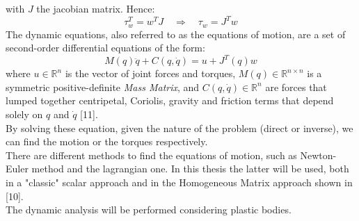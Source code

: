 \documentclass[a4paper,12pt,oneside]{report}
\begin{document}
with $J$ the jacobian matrix. Hence:
\begin{equation}
  \tau_w^T=w^TJ \quad \Rightarrow \quad \tau_w=J^Tw
  \label{force_jacobian}
\end{equation}
The dynamic equations, also referred to as the equations of motion, are a set of second-order differential equations of the form:
\begin{equation}
  M(q)\ddot{q}+C(q,\dot{q})=u+J^T(q)w
  \label{equation_motion}
\end{equation}
where $u \in \mathbb{R}^n$ is the vector of joint forces and torques, $M(q) \in \mathbb{R}^{n \times n}$ is a symmetric positive-definite \textit{Mass Matrix}, and $C(q,\dot{q}) \in \mathbb{R}^n$ are forces that lumped together centripetal, Coriolis, gravity and friction terms that depend solely on $q$ and $\dot{q}$ [11].\\
By solving these equation, given the nature of the problem (direct or inverse), we can find the motion or the torques respectively.\\
There are different methods to find the equations of motion, such as Newton-Euler method and the lagrangian one. In this thesis the latter will be used, both in a "classic" scalar approach and in the Homogeneous Matrix approach shown in [10].\\
The dynamic analysis will be performed considering plastic bodies.
\newpage
\end{document}
